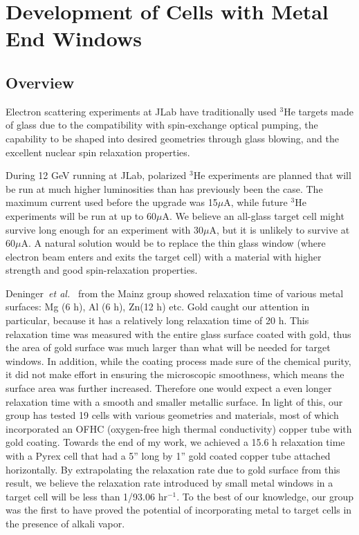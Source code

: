 \chapter{Development of Cells with Metal End Windows}
\label{chap5}

\section{Overview}

Electron scattering experiments at JLab have traditionally used $^{3}$He targets made of glass due to the compatibility with spin-exchange optical pumping, the capability to be shaped into desired geometries through glass blowing, and the excellent nuclear spin relaxation properties. 

During 12 GeV running at JLab, polarized $^3$He experiments are planned that will be run at much higher luminosities than has previously been the case. The maximum current used before the upgrade was 15$\mu$A, while future $^3$He experiments will be run at up to 60$\mu$A. We believe an all-glass target cell might survive long enough for an experiment with 30$\mu$A, but it is unlikely to survive at 60$\mu$A. A natural solution would be to replace the thin glass window (where electron beam enters and exits the target cell) with a material with higher strength and good spin-relaxation properties. 

Deninger~\emph{et al.}~\cite{Schmiedeskamp2006} from the Mainz group showed relaxation time of various metal surfaces: Mg (6 h), Al (6 h), Zn(12 h) etc. Gold caught our attention in particular, because it has a relatively long relaxation time of 20 h. This relaxation time was measured with the entire glass surface coated with gold, thus the area of gold surface was much larger than what will be needed for target windows. In addition, while the coating process made sure of the chemical purity, it did not make effort in ensuring the microscopic smoothness, which means the surface area was further increased. Therefore one would expect a even longer relaxation time with a smooth and smaller metallic surface. In light of this, our group has tested 19 cells with various geometries and materials, most of which incorporated an OFHC (oxygen-free high thermal conductivity) copper tube with gold coating. Towards the end of my work, we achieved a 15.6 h relaxation time with a Pyrex cell that had a 5'' long by 1'' gold coated copper tube attached horizontally. By extrapolating the relaxation rate due to gold surface from this result, we believe the relaxation rate introduced by small metal windows in a target cell will be less than 1/93.06 hr$^{-1}$. To the best of our knowledge, our group was the first to have proved the potential of incorporating metal to target cells in the presence of alkali vapor.

